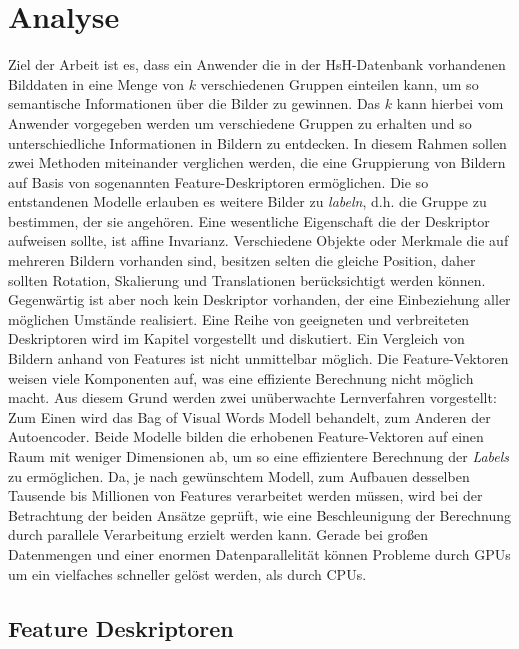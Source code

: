 \chapter{Analyse}

Ziel der Arbeit ist es, dass ein Anwender die in der HsH-Datenbank vorhandenen Bilddaten in eine Menge von $k$ verschiedenen Gruppen einteilen kann, um so semantische Informationen über die Bilder zu gewinnen. Das $k$ kann hierbei vom Anwender vorgegeben werden um verschiedene Gruppen zu erhalten und so unterschiedliche Informationen in Bildern zu entdecken. 
In diesem Rahmen sollen zwei Methoden miteinander verglichen werden, die eine Gruppierung von Bildern auf Basis von sogenannten Feature-Deskriptoren ermöglichen.  Die so entstandenen Modelle erlauben es weitere Bilder zu \textit{labeln}, d.h. die Gruppe zu bestimmen, der sie angehören. Eine wesentliche Eigenschaft die der Deskriptor aufweisen sollte, ist affine Invarianz. Verschiedene Objekte oder Merkmale die auf mehreren Bildern vorhanden sind, besitzen selten die gleiche Position, daher sollten Rotation, Skalierung und Translationen berücksichtigt werden können. Gegenwärtig ist aber noch kein Deskriptor vorhanden, der eine Einbeziehung aller möglichen Umstände realisiert. Eine Reihe von geeigneten und verbreiteten Deskriptoren wird im Kapitel  vorgestellt und diskutiert.
Ein Vergleich von Bildern anhand von Features ist nicht unmittelbar möglich. Die Feature-Vektoren weisen viele Komponenten auf, was eine effiziente Berechnung nicht möglich macht. Aus diesem Grund werden zwei unüberwachte Lernverfahren vorgestellt: Zum Einen wird das Bag of Visual Words Modell behandelt, zum Anderen der Autoencoder. Beide Modelle bilden die erhobenen Feature-Vektoren auf einen Raum mit weniger Dimensionen ab, um so eine effizientere Berechnung der \textit{Labels} zu ermöglichen. Da, je nach gewünschtem Modell, zum Aufbauen desselben Tausende bis Millionen von Features verarbeitet werden müssen, wird bei der Betrachtung der beiden Ansätze geprüft, wie eine Beschleunigung der Berechnung durch parallele Verarbeitung erzielt werden kann. Gerade bei großen Datenmengen und einer enormen Datenparallelität können Probleme durch GPUs um ein vielfaches schneller gelöst werden, als durch CPUs.


\section{Feature Deskriptoren}
\label{extraction}

